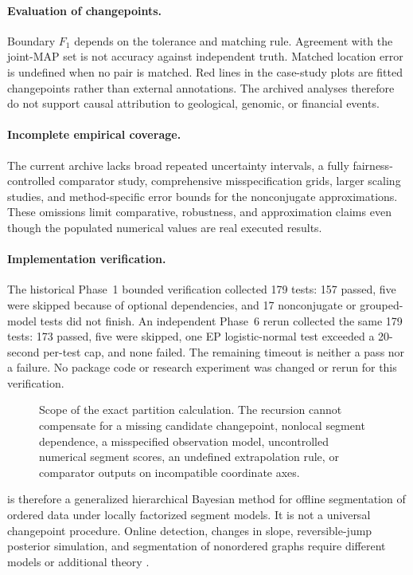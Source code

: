 \paragraph{Evaluation of changepoints.}
Boundary $F_1$ depends on the tolerance and matching rule. Agreement with the \BayesBreak joint-MAP set is not accuracy against independent truth. Matched location error is undefined when no pair is matched. Red lines in the case-study plots are fitted changepoints rather than external annotations. The archived analyses therefore do not support causal attribution to geological, genomic, or financial events.

\paragraph{Incomplete empirical coverage.}
The current archive lacks broad repeated uncertainty intervals, a fully fairness-controlled comparator study, comprehensive misspecification grids, larger scaling studies, and method-specific error bounds for the nonconjugate approximations. These omissions limit comparative, robustness, and approximation claims even though the populated numerical values are real executed results.

\paragraph{Implementation verification.}
The historical Phase~1 bounded verification collected 179 tests: 157 passed, five were skipped because of optional dependencies, and 17 nonconjugate or grouped-model tests did not finish. An independent Phase~6 rerun collected the same 179 tests: 173 passed, five were skipped, one EP logistic-normal test exceeded a 20-second per-test cap, and none failed. The remaining timeout is neither a pass nor a failure. No package code or research experiment was changed or rerun for this verification.

\begin{figure}[t]
  \centering
  \resizebox{0.86\textwidth}{!}{}
  \caption{Scope of the exact partition calculation. The recursion cannot compensate for a missing candidate changepoint, nonlocal segment dependence, a misspecified observation model, uncontrolled numerical segment scores, an undefined extrapolation rule, or comparator outputs on incompatible coordinate axes.}
  \label{fig:scope-failure-paper}
\end{figure}

\BayesBreak is therefore a generalized hierarchical Bayesian method for offline segmentation of ordered data under locally factorized segment models. It is not a universal changepoint procedure. Online detection, changes in slope, reversible-jump posterior simulation, and segmentation of nonordered graphs require different models or additional theory \citep{adamsmackay2007bocpd,ruggieri2014bcpvs,green1995rjMCMC,fearnhead2006exact}.
